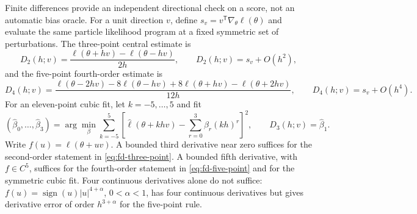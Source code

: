 \documentclass[11pt]{article}
\begin{document}
Finite differences provide an independent directional check on a score, not an
automatic bias oracle. For a unit direction $v$, define
$s_v=v^\mathsf T\nabla_\theta\ell(\theta)$ and evaluate the same particle
likelihood program at a fixed symmetric set of perturbations. The three-point
central estimate is
\begin{equation}
 D_2(h;v)=\frac{\ell(\theta+hv)-\ell(\theta-hv)}{2h},
 \qquad D_2(h;v)=s_v+O(h^2),
 \label{eq:fd-three-point}
\end{equation}
and the five-point fourth-order estimate is
\begin{equation}
 D_4(h;v)=\frac{\ell(\theta-2hv)-8\ell(\theta-hv)+8\ell(\theta+hv)-\ell(\theta+2hv)}{12h},
 \qquad D_4(h;v)=s_v+O(h^4).                    \label{eq:fd-five-point}
\end{equation}
For an eleven-point cubic fit, let $k=-5,\ldots,5$ and fit
\begin{equation}
 (\widehat\beta_0,\ldots,\widehat\beta_3)
 =\arg\min_\beta\sum_{k=-5}^{5}
 \left[\widehat\ell(\theta+khv)-\sum_{r=0}^{3}\beta_r(kh)^r\right]^2,
 \qquad D_3(h;v)=\widehat\beta_1.              \label{eq:fd-cubic-fit}
\end{equation}
Write $f(u)=\ell(\theta+uv)$. A bounded third derivative near zero suffices
for the second-order statement in \eqref{eq:fd-three-point}. A bounded fifth
derivative, with $f\in C^5$, suffices for the fourth-order statement in
\eqref{eq:fd-five-point} and for the symmetric cubic fit. Four continuous
derivatives alone do not suffice: $f(u)=\operatorname{sign}(u)|u|^{4+\alpha}$,
$0<\alpha<1$, has four continuous derivatives but gives derivative error
of order $h^{3+\alpha}$ for the five-point rule.
\end{document}
